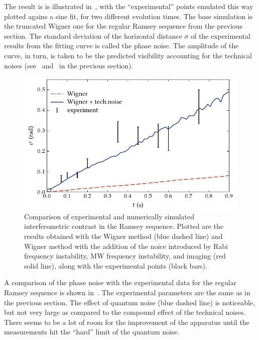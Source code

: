 The result is is illustrated in~, with the ``experimental'' points emulated this way plotted agains a sine fit, for two different evolution times.
The base simulation is the truncated Wigner one for the regular Ramsey sequence from the previous section.
The standard deviation of the horizontal distance $\sigma$ of the experimental results from the fitting curve is called the phase noise.
The amplitude of the curve, in turn, is taken to be the predicted visibility accounting for the technical noises (see~ and~ in the previous section).

\begin{figure}
    \centerline{\includegraphics{figures_generated/bec_noise/ramsey_noise.pdf}}

    \caption{Comparison of experimental and numerically simulated interferometric contrast in the Ramsey sequence.
    Plotted are the results obtained with the Wigner method (blue dashed line) and Wigner method with the addition of the noice introduced by Rabi frequency instability, MW frequency instability, and imaging (red solid line), along with the experimental points (black bars).}

    \label{fig:bec-noise:phase-noise:ramsey-phnoise}
\end{figure}

A comparison of the phase noise with the experimental data for the regular Ramsey sequence is shown in~.
The experimental parameters are the same as in the previous section.
The effect of quantum noise (blue dashed line) is noticeable, but not very large as compared to the compound effect of the technical noises.
There seems to be a lot of room for the improvement of the apparatus until the measurements hit the ``hard'' limit of the quantum noise.

